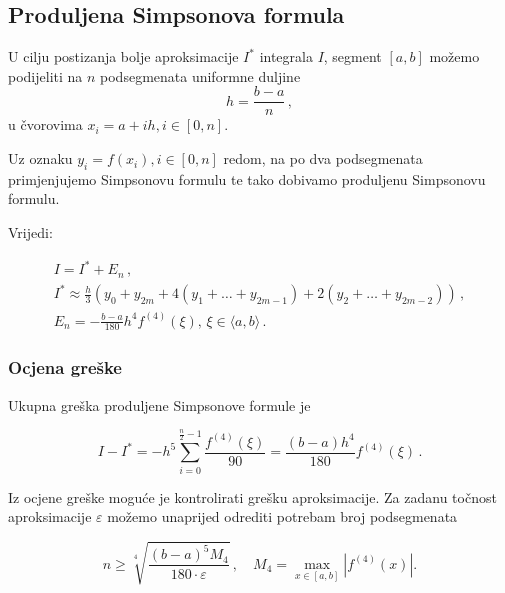 \subsection{Produljena Simpsonova formula}

U cilju postizanja bolje aproksimacije $I^*$ integrala $I$, segment $[a,b]$
možemo podijeliti na $n$ podsegmenata uniformne duljine
$$
h=\frac{b-a}{n}\,,
$$
u čvorovima $x_i=a+ih, i \in [0,n]$.

Uz oznaku $y_i=f(x_i), i \in [0,n]$ redom, na po dva podsegmenata primjenjujemo
Simpsonovu formulu te tako dobivamo produljenu Simpsonovu formulu.

Vrijedi:

\begin{gather*}
    I = I^* + E_n\,,\\
    I^* \approx \frac{h}{3}(y_0+y_{2m}+4(y_1+\dots+y_{2m-1})+2(y_2+\dots+y_{2m-2}))\,,\\
    E_n = -\frac{b-a}{180}h^4f^{(4)}(\xi),\, \xi\in\langle a, b \rangle\,.
\end{gather*}

\pagebreak

\subsubsection{Ocjena greške}

Ukupna greška produljene Simpsonove formule je

$$
I - I^* = -h^5\sum_{i=0}^{\frac{n}{2}-1}\frac{f^{(4)}(\xi)}{90} = \frac{(b-a)h^4}{180}f^{(4)}(\xi)\,.
$$

Iz ocjene greške moguće je kontrolirati grešku aproksimacije. Za zadanu točnost
aproksimacije $\varepsilon$ možemo unaprijed odrediti potrebam broj podsegmenata

$$
n\geq \sqrt[4]{\frac{(b-a)^5M_4}{180\cdot \varepsilon}}\,,\quad M_4 = \max_{x\in[a,b]}|f^{(4)}(x)|.
$$
